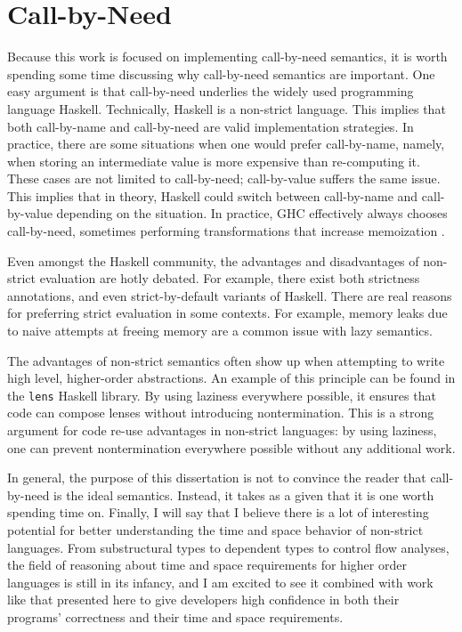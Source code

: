 \section{Call-by-Need}

Because this work is focused on implementing call-by-need semantics, it is worth
spending some time discussing why call-by-need semantics are important. One easy
argument is that call-by-need underlies the widely used programming language
Haskell. Technically, Haskell is a non-strict language. This implies that both
call-by-name and call-by-need are valid implementation strategies. In practice,
there are some situations when one would prefer call-by-name, namely, when
storing an intermediate value is more expensive than re-computing it. These
cases are not limited to call-by-need; call-by-value suffers the same issue.
This implies that in theory, Haskell could switch between call-by-name and
call-by-value depending on the situation. In practice, GHC effectively always
chooses call-by-need, sometimes performing transformations that increase
memoization \cite{jones96floating}.

Even amongst the Haskell community, the advantages and disadvantages of
non-strict evaluation are hotly debated. For example, there exist both
strictness annotations, and even strict-by-default variants of Haskell. There are
real reasons for preferring strict evaluation in some contexts. For example,
memory leaks due to naive attempts at freeing memory are a common issue with
lazy semantics. 

The advantages of non-strict semantics often show up when attempting to write
high level, higher-order abstractions. An example of this principle can be found
in the \texttt{lens} Haskell library. By using laziness everywhere possible, it
ensures that code can compose lenses without introducing nontermination. This is
a strong argument for code re-use advantages in non-strict languages: by using
laziness, one can prevent nontermination everywhere possible without any
additional work. 

In general, the purpose of this dissertation is not to convince the reader that
call-by-need is the ideal semantics. Instead, it takes as a given that it is one
worth spending time on. Finally, I will say that I believe there is a lot of
interesting potential for better understanding the time and space behavior of
non-strict languages. From substructural types to dependent types to control
flow analyses, the field of reasoning about time and space requirements for
higher order languages is still in its infancy, and I am excited to see it
combined with work like that presented here to give developers high confidence
in both their programs' correctness and their time and space requirements. 

